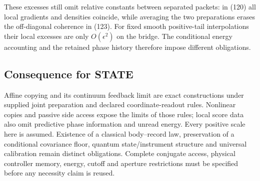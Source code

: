 \documentclass[11pt,a4paper]{article}
\begin{document}
These excesses still omit relative constants between separated packets:
in (120) all local gradients and densities coincide, while averaging the
two preparations erases the off-diagonal coherence in (123). For fixed
smooth positive-tail interpolations their local excesses are only
\(O(\epsilon^2)\) on the bridge. The conditional energy accounting and
the retained phase history therefore impose different obligations.

\hypertarget{consequence-for-state}{%
\subsection{Consequence for STATE}\label{consequence-for-state}}

Affine copying and its continuum feedback limit are exact constructions
under supplied joint preparation and declared coordinate-readout rules.
Nonlinear copies and passive side access expose the limits of those
rules; local score data also omit predictive phase information and
unread energy. Every positive scale here is assumed. Existence of a
classical body--record law, preservation of a conditional covariance
floor, quantum state/instrument structure and universal calibration
remain distinct obligations. Complete conjugate access, physical
controller memory, energy, cutoff and aperture restrictions must be
specified before any necessity claim is reused.
\end{document}
